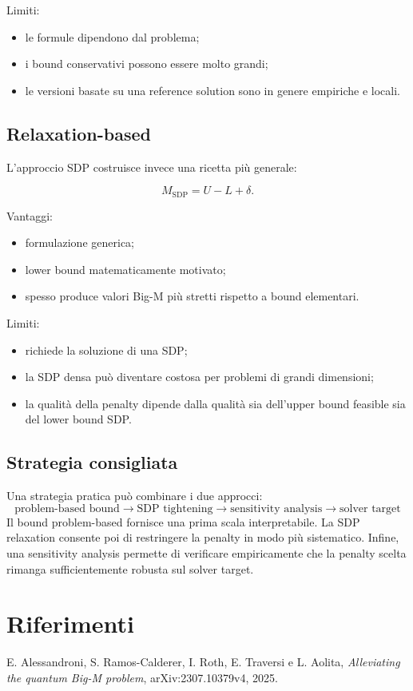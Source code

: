\documentclass[11pt,a4paper]{report}
\begin{document}
Limiti:

\begin{itemize}
    \item le formule dipendono dal problema;
    \item i bound conservativi possono essere molto grandi;
    \item le versioni basate su una reference solution sono in genere
    empiriche e locali.
\end{itemize}

\section{Relaxation-based}

L'approccio SDP costruisce invece una ricetta più generale:

\[
M_{\mathrm{SDP}}
=
U-L+\delta.
\]

Vantaggi:

\begin{itemize}
    \item formulazione generica;
    \item lower bound matematicamente motivato;
    \item spesso produce valori Big-M più stretti rispetto a bound
    elementari.
\end{itemize}

Limiti:

\begin{itemize}
    \item richiede la soluzione di una SDP;
    \item la SDP densa può diventare costosa per problemi di grandi
    dimensioni;
    \item la qualità della penalty dipende dalla qualità sia
    dell'upper bound feasible sia del lower bound SDP.
\end{itemize}

\section{Strategia consigliata}

Una strategia pratica può combinare i due approcci:
\[
\boxed{
\text{problem-based bound}
\rightarrow
\text{SDP tightening}
\rightarrow
\text{sensitivity analysis}
\rightarrow
\text{solver target}
}
\]
Il bound problem-based fornisce una prima scala interpretabile.
La SDP relaxation consente poi di restringere la penalty in modo più
sistematico.
Infine, una sensitivity analysis permette di verificare empiricamente
che la penalty scelta rimanga sufficientemente robusta sul solver target.

\chapter{Riferimenti}

E. Alessandroni, S. Ramos-Calderer, I. Roth, E. Traversi e L. Aolita,
\emph{Alleviating the quantum Big-M problem},
arXiv:2307.10379v4, 2025.
\end{document}
